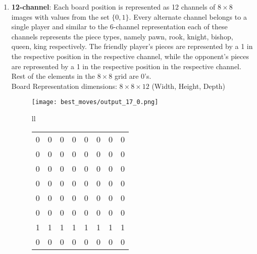 \begin{enumerate}
\begin{figure}[H]
\begin{longtable}[width=\textwidth]{ll}
\begin{tabular}[width=0.33\textwidth]{|llllllll|}
    0  & 0  & 0  & 0  & 0  & 0  & 0  & 0  \\
    0  & 0  & 0  & 0  & 0  & 0  & 0  & 0  \\
    0  & 0  & 0  & 0  & 0  & 0  & 0  & 0  \\
    0  & 0  & 0  & 0  & 1  & 0  & 0  & 0  \\ \hline
    \end{tabular}
  \end{longtable}
\caption{\textbf{6-channel representation} of the initial chess board position}
\small
Leftmost matrix represents the pawn channel. It is followed by the channels 
for Rook, Knight, Bishop and Queen and the rightmost matrix represents the 
king channel.
\end{figure}

\label{section:representation12}
\item\textbf{12-channel}: Each board position is represented as 12 channels of 
$8\times 8$ images with values from the set $\{0,1\}$. Every alternate channel 
belongs to a single player and similar to the 6-channel representation each of 
these channels represents the piece types, namely pawn, rook, knight, bishop, 
queen, king respectively. The friendly player's pieces are represented by a 1 in 
the respective position in the respective channel, while the opponent's pieces 
are represented by a 1 in the respective position in the respective channel. 
Rest of the elements in the $8\times 8$ grid are 0's.\\
Board Representation dimensions: $8\times 8 \times 12$ (Width, Height, Depth)
\begin{figure}[H]
\centering
\texttt{[image: best\_moves/output\_17\_0.png]}
\begin{longtable}[width=\textwidth]{ll}
\small
   \begin{tabular}[width=0.33\textwidth]{|llllllll|}
    \hline
    0  & 0  & 0  & 0  & 0  & 0  & 0  & 0  \\
    0  & 0  & 0  & 0  & 0  & 0  & 0  & 0  \\
    0  & 0  & 0  & 0  & 0  & 0  & 0  & 0  \\
    0  & 0  & 0  & 0  & 0  & 0  & 0  & 0  \\
    0  & 0  & 0  & 0  & 0  & 0  & 0  & 0  \\
    0  & 0  & 0  & 0  & 0  & 0  & 0  & 0  \\
    1  & 1  & 1  & 1  & 1  & 1  & 1  & 1  \\
    0  & 0  & 0  & 0  & 0  & 0  & 0  & 0  \\ \hline

\end{tabular}
\end{longtable}
\end{figure}
\end{enumerate}
